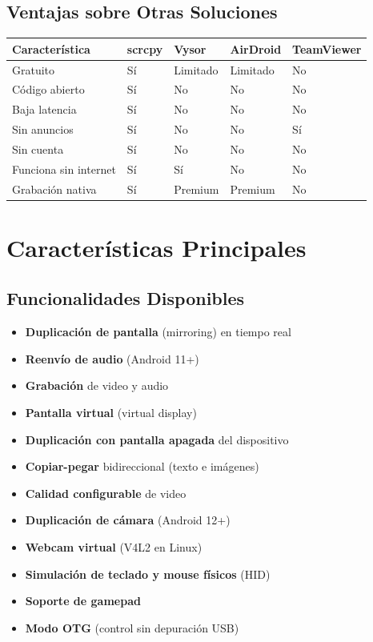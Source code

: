 \documentclass[
  doc,
  floatsintext,
  longtable,
  a4paper,
  nolmodern,
  notxfonts,
  notimes,
  12pt,
  colorlinks=true,linkcolor=blue,citecolor=blue,urlcolor=blue]{apa7}
\providecommand{\tightlist}{%
  \setlength{\itemsep}{0pt}\setlength{\parskip}{0pt}}
\newcounter{none} %
\begin{document}
\subsection{Ventajas sobre Otras
Soluciones}\label{ventajas-sobre-otras-soluciones}

{\def\LTcaptype{none} %
\begin{longtable}[]{@{}lllll@{}}
\toprule\noalign{}
Característica & scrcpy & Vysor & AirDroid & TeamViewer \\
\midrule\noalign{}
\endhead
\bottomrule\noalign{}
\endlastfoot
Gratuito & Sí & Limitado & Limitado & No \\
Código abierto & Sí & No & No & No \\
Baja latencia & Sí & No & No & No \\
Sin anuncios & Sí & No & No & Sí \\
Sin cuenta & Sí & No & No & No \\
Funciona sin internet & Sí & Sí & No & No \\
Grabación nativa & Sí & Premium & Premium & No \\
\end{longtable}
}

\section{Características
Principales}\label{caracteruxedsticas-principales}

\subsection{Funcionalidades
Disponibles}\label{funcionalidades-disponibles}

\begin{itemize}
\tightlist
\item
  \textbf{Duplicación de pantalla} (mirroring) en tiempo real
\item
  \textbf{Reenvío de audio} (Android 11+)
\item
  \textbf{Grabación} de video y audio
\item
  \textbf{Pantalla virtual} (virtual display)
\item
  \textbf{Duplicación con pantalla apagada} del dispositivo
\item
  \textbf{Copiar-pegar} bidireccional (texto e imágenes)
\item
  \textbf{Calidad configurable} de video
\item
  \textbf{Duplicación de cámara} (Android 12+)
\item
  \textbf{Webcam virtual} (V4L2 en Linux)
\item
  \textbf{Simulación de teclado y mouse físicos} (HID)
\item
  \textbf{Soporte de gamepad}
\item
  \textbf{Modo OTG} (control sin depuración USB)
\end{itemize}
\end{document}
